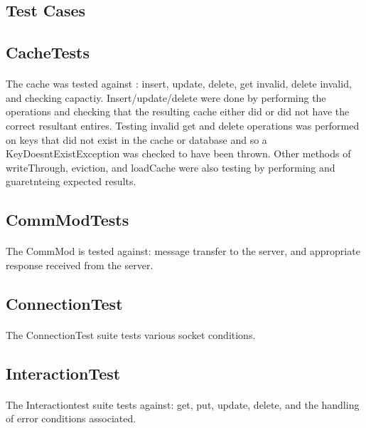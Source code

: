 \documentclass[10pt]{article}
\begin{document}
\begin{multicols}{2}
\section{Test Cases}

\subsection{CacheTests}

\paragraph{} The cache was tested against : insert, update, delete, get invalid, delete invalid, and checking capactiy. Insert/update/delete were done by performing the operations and checking that the resulting cache either did or did not have the correct resultant entires. Testing invalid get and delete operations was performed on keys that did not exist in the cache or database and so a KeyDoesntExistException was checked to have been thrown. Other methods of writeThrough, eviction, and loadCache were also testing by performing and guaretnteing expected results.

\subsection{CommModTests}

\paragraph{} The CommMod is tested against: message transfer to the server, and appropriate response received from the server.

\subsection{ConnectionTest}

\paragraph{} The ConnectionTest suite tests various socket conditions.

\subsection{InteractionTest}

\paragraph{} The Interactiontest suite tests against: get, put, update, delete, and the handling of error conditions associated.


\end{multicols}
\end{document}
